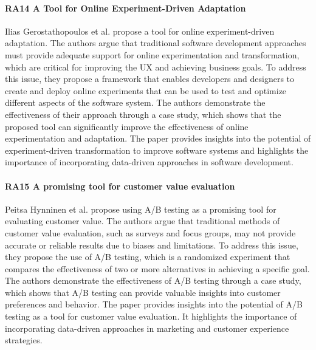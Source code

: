 \paragraph{RA14 A Tool for Online Experiment-Driven Adaptation}
Ilias Gerostathopoulos et al. \cite{misc:experiment:ilias} propose a tool for online experiment-driven adaptation. 
The authors argue that traditional software development approaches must provide adequate support for online experimentation and transformation, which are critical for improving the UX and achieving business goals. 
To address this issue, they propose a framework that enables developers and designers to create and deploy online experiments that can be used to test and optimize different aspects of the software system. 
The authors demonstrate the effectiveness of their approach through a case study, which shows that the proposed tool can significantly improve the effectiveness of online experimentation and adaptation. 
The paper provides insights into the potential of experiment-driven transformation to improve software systems and highlights the importance of incorporating data-driven approaches in software development.

\paragraph{RA15 A promising tool for customer value evaluation}
Peitsa Hynninen et al. \cite{misc:abtest:marjo} propose using A/B testing as a promising tool for evaluating customer value. 
The authors argue that traditional methods of customer value evaluation, such as surveys and focus groups, may not provide accurate or reliable results due to biases and limitations. 
To address this issue, they propose the use of A/B testing, which is a randomized experiment that compares the effectiveness of two or more alternatives in achieving a specific goal. 
The authors demonstrate the effectiveness of A/B testing through a case study, which shows that A/B testing can provide valuable insights into customer preferences and behavior. 
The paper provides insights into the potential of A/B testing as a tool for customer value evaluation. 
It highlights the importance of incorporating data-driven approaches in marketing and customer experience strategies. 

\clearpage

